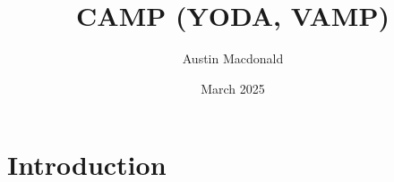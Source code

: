 \documentclass{article}
\title{CAMP (YODA, VAMP)}
\author{Austin Macdonald}
\date{March 2025}
\begin{document}
\maketitle

\section{Introduction}
\end{document}

